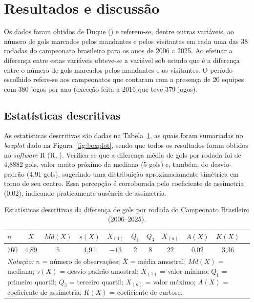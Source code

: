 \documentclass[12pt,a4paper]{article}\usepackage[]{graphicx}\usepackage[]{xcolor}
\begin{document}
\section{Resultados e discussão}

Os dados foram obtidos de Duque (\citeyear{Duque2025}) e referem-se, dentre outras variáveis, ao número de gols marcados pelos mandantes e pelos visitantes em cada uma das 38 rodadas do campeonato brasileiro para os anos de 2006 a 2025. Ao efetuar a diferença entre estas variáveis obteve-se a variável sob estudo que é a diferença entre o número de gols marcados pelos mandantes e os visitantes. O período escolhido refere-se aos campeonatos que contaram com a presença de 20 equipes com 380 jogos por ano (exceção feita a 2016 que teve 379 jogos). 

\subsection{Estatísticas descritivas}
As estatísticas descritivas são dadas na Tabela~\ref{tab:descritiva}, as quais foram sumariadas no \textit{boxplot} dado na Figura~\ref{fig:boxplot}, sendo que todos os resultados foram obtidos no \textit{software} R (R, \citeyear{R2026}). Verifica-se que a diferença média de gols por rodada foi de 4,8882 gols, valor muito próximo da mediana (5  gols) e, também, do desvio-padrão (4,91 gols), sugerindo uma distribuição aproximadamente simétrica em torno de seu centro. Essa percepção é corroborada pelo coeficiente de assimetria (0,02), indicando praticamente ausência de assimetria.

\begin{table}[!ht]
\centering
\caption{Estatísticas descritivas da diferença de gols por rodada do Campeonato Brasileiro (2006--2025).}\label{tab:descritiva}
\begin{tabular}{lcccccccccc}
\hline
$n$ &
$\bar{X}$ &$Md(X)$ &$s(X)$&$X_{(1)}$ &$Q_1$ &$Q_3$ &$X_{(n)}$ & 
$A(X)$ &
$K(X)$\\
\hline
760 &
4,89 &
5 &
4,91 &
$-13$ &
2 &
8 &
22 &
0,02 &
3,36\\
\hline
\multicolumn{10}{p{0.95\textwidth}}{\scriptsize
\textit{Notação:} $n$ = número de observações;
$\bar{X}$ = média amostral;
$Md(X)$ = mediana;
$s(X)$ = desvio-padrão amostral;
$X_{(1)}$ = valor mínimo;
$Q_1$ = primeiro quartil;
$Q_3$ = terceiro quartil;
$X_{(n)}$ = valor máximo;
$A(X)$ = coeficiente de assimetria;
$K(X)$ = coeficiente de curtose.
}\\
\end{tabular}
\end{table}
\end{document}
